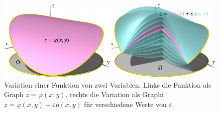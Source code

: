 %
%
%
\begin{figure}
\centering
\includegraphics{chapters/040-felder/images/variation.pdf}
\caption{Variation einer Funktion von zwei Variablen.
Links die Funktion als Graph $z=\varphi(x,y)$, rechts die Variation
als Graphi $z=\varphi(x,y) + \varepsilon\eta(x,y)$ für verschiedene
Werte von $\varepsilon$.
\label{buch:felder:ostrogradski:fig:variation}}
\end{figure}
